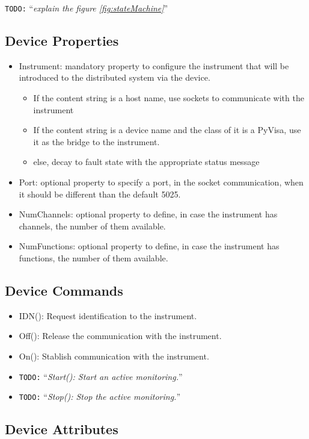 \documentclass[a4paper,10pt]{article}
\newcommand{\todo}[1]{\texttt{\color{red}TODO:} ``\emph{#1}''}
\begin{document}
\todo{explain the figure \ref{fig:stateMachine}}

\subsection{Device Properties}

\begin{itemize}
    \item Instrument: mandatory property to configure the instrument that will be introduced to the distributed system via the device.
    \begin{itemize}
        \item If the content string is a host name, use sockets to communicate with the instrument
        \item If the content string is a device name and the class of it is a PyVisa, use it as the bridge to the instrument.
        \item else, decay to fault state with the appropriate status message
    \end{itemize}
    \item Port: optional property to specify a port, in the socket communication, when it should be different than the default 5025.
    \item NumChannels: optional property to define, in case the instrument has channels, the number of them available.
    \item NumFunctions: optional property to define, in case the instrument has functions, the number of them available.
\end{itemize}

\subsection{Device Commands}

\begin{itemize}
    \item IDN(): Request identification to the instrument.
    \item Off(): Release the communication with the instrument.
    \item On(): Stablish communication with the instrument.
    \item \todo{Start(): Start an active monitoring.}
    \item \todo{Stop(): Stop the active monitoring.}
\end{itemize}

\subsection{Device Attributes}
\end{document}
